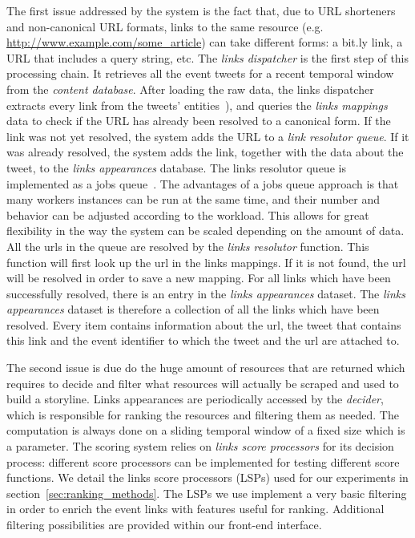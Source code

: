 \documentclass{sig-alternate}
\begin{document}
The first issue addressed by the system is the fact that, due to URL shorteners and non-canonical URL formats, links to the same resource (e.g. \url{http://www.example.com/some\_article}) can take different forms: a bit.ly link, a URL that includes a query string, etc. The \emph{links dispatcher} is the first step of this processing chain. It retrieves all the event tweets for a recent temporal window from the \emph{content database}. After loading the raw data, the links dispatcher extracts every link from the tweets' entities~\cite{RestTweetsDoc}), and queries the \emph{links mappings} data to check if the URL has already been resolved to a canonical form. If the link was not yet resolved, the system adds the URL to a \emph{link resolutor queue}. If it was already resolved, the system adds the link, together with the data about the tweet, to the \emph{links appearances} database. The links resolutor queue is implemented as a jobs queue~\cite{RedisQueues}. The advantages of a jobs queue approach is that many workers instances can be run at the same time, and their number and behavior can be adjusted according to the workload. This allows for great flexibility in the way the system can be scaled depending on the amount of data. All the urls in the queue are resolved by the \emph{links resolutor} function. This function will first look up the url in the links mappings. If it is not found, the url will be resolved in order to save a new mapping. For all links which have been successfully resolved, there is an entry in the \emph{links appearances} dataset. The \emph{links appearances} dataset is therefore a collection of all the links which have been resolved. Every item contains information about the url, the tweet that contains this link and the event identifier to which the tweet and the url are attached to.

The second issue is due do the huge amount of resources that are returned which requires to decide and filter what resources will actually be scraped and used to build a storyline. Links appearances are periodically accessed by the \emph{decider}, which is responsible for ranking the resources and filtering them as needed. The computation is always done on a sliding temporal window of a fixed size which is a parameter. The scoring system relies on \emph{links score processors} for its decision process: different score processors can be implemented for testing different score functions. We detail the links score processors (LSPs) used for our experiments in section~\ref{sec:ranking_methods}. The LSPs we use implement a very basic filtering in order to enrich the event links with features useful for ranking. Additional filtering possibilities are provided within our front-end interface.
\end{document}
